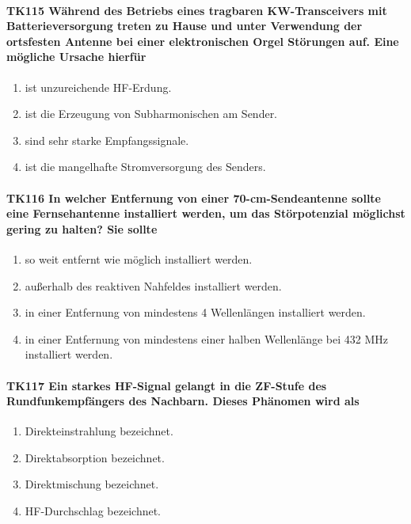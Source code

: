 \documentclass[8pt]{article}
\begin{document}
\paragraph*{TK115 Während des Betriebs eines tragbaren KW-Transceivers mit Batterieversorgung treten zu Hause und unter Verwendung der ortsfesten Antenne bei einer elektronischen Orgel Störungen auf. Eine mögliche Ursache hierfür}
\begin{enumerate}[nolistsep,label=\Alph*]
\item ist unzureichende HF-Erdung.
\item ist die Erzeugung von Subharmonischen am Sender.
\item sind sehr starke Empfangssignale.
\item ist die mangelhafte Stromversorgung des Senders.
\end{enumerate}

\paragraph*{TK116 In welcher Entfernung von einer 70-cm-Sendeantenne sollte eine Fernsehantenne installiert werden, um das Störpotenzial möglichst gering zu halten? Sie sollte} 
\begin{enumerate}[nolistsep,label=\Alph*]
\item so weit entfernt wie möglich installiert werden.
\item außerhalb des reaktiven Nahfeldes installiert werden.
\item in einer Entfernung von mindestens 4 Wellenlängen installiert werden.
\item in einer Entfernung von mindestens einer halben Wellenlänge bei 432 MHz installiert werden.
\end{enumerate}

\paragraph*{TK117 Ein starkes HF-Signal gelangt in die ZF-Stufe des Rundfunkempfängers des Nachbarn. Dieses Phänomen wird als}
\begin{enumerate}[nolistsep,label=\Alph*]
\item Direkteinstrahlung bezeichnet.
\item Direktabsorption bezeichnet.
\item Direktmischung bezeichnet.
\item HF-Durchschlag bezeichnet.
\end{enumerate}
\end{document}

